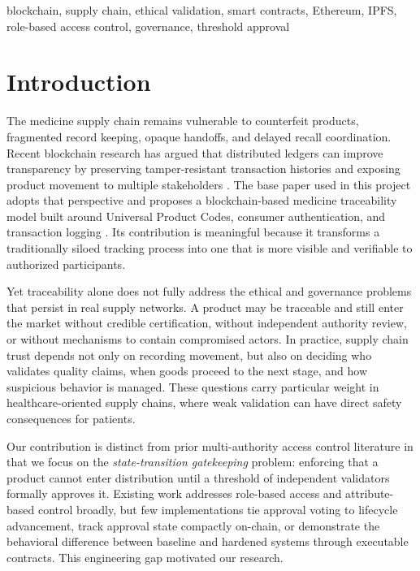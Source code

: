 \documentclass[conference]{IEEEtran}
\begin{document}
\begin{IEEEkeywords}
blockchain, supply chain, ethical validation, smart contracts, Ethereum, IPFS, role-based access control, governance, threshold approval
\end{IEEEkeywords}

\section{Introduction}

The medicine supply chain remains vulnerable to counterfeit products, fragmented record keeping, opaque handoffs, and delayed recall coordination. Recent blockchain research has argued that distributed ledgers can improve transparency by preserving tamper-resistant transaction histories and exposing product movement to multiple stakeholders \cite{latif2025,wang2019,frontiers2024,mdpi2025}. The base paper used in this project adopts that perspective and proposes a blockchain-based medicine traceability model built around Universal Product Codes, consumer authentication, and transaction logging \cite{latif2025}. Its contribution is meaningful because it transforms a traditionally siloed tracking process into one that is more visible and verifiable to authorized participants.

Yet traceability alone does not fully address the ethical and governance problems that persist in real supply networks. A product may be traceable and still enter the market without credible certification, without independent authority review, or without mechanisms to contain compromised actors. In practice, supply chain trust depends not only on recording movement, but also on deciding who validates quality claims, when goods proceed to the next stage, and how suspicious behavior is managed. These questions carry particular weight in healthcare-oriented supply chains, where weak validation can have direct safety consequences for patients.

Our contribution is distinct from prior multi-authority access control literature in that we focus on the \textit{state-transition gatekeeping} problem: enforcing that a product cannot enter distribution until a threshold of independent validators formally approves it. Existing work addresses role-based access and attribute-based control broadly, but few implementations tie approval voting to lifecycle advancement, track approval state compactly on-chain, or demonstrate the behavioral difference between baseline and hardened systems through executable contracts. This engineering gap motivated our research.
\end{document}
